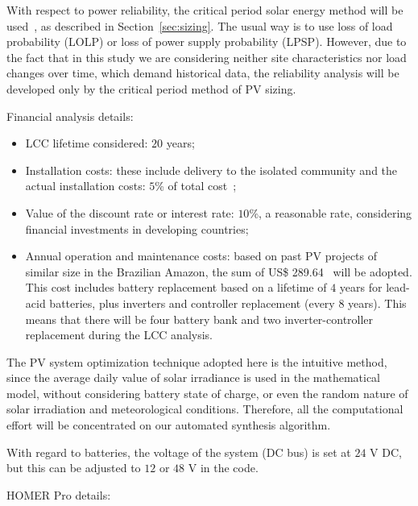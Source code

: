 With respect to power reliability, the critical period solar energy method will be used~\cite{Pinho}, as described in Section~\ref{sec:sizing}. The usual way is to use loss of load probability (LOLP) or loss of power supply probability (LPSP). However, due to the fact that in this study we are considering neither site characteristics nor load changes over time, which demand historical data, the reliability analysis will be developed only by the critical period method of PV sizing.

Financial analysis details:
\begin{itemize}
	\item LCC lifetime considered: $20$ years;
	\item Installation costs: these include delivery to the isolated community and the actual installation costs: $5$\% of total cost~\cite{Agrener2013};
	\item Value of the discount rate or interest rate: $10$\%, a reasonable rate, considering financial investments in developing countries;
	\item Annual operation and maintenance costs: based on past PV projects of similar size in the Brazilian Amazon, the sum of US\$ 289.64~\cite{Agrener2013} will be adopted. This cost includes battery replacement based on a lifetime of $4$ years for lead-acid batteries, plus inverters and controller replacement (every $8$ years). This means that there will be four battery bank and two inverter-controller replacement during the LCC analysis.
\end{itemize}

The PV system optimization technique adopted here is the intuitive method, since the average daily value of solar irradiance is used in the mathematical model, without considering battery state of charge, or even the random nature of solar irradiation and meteorological conditions. Therefore, all the computational effort will be concentrated on our automated synthesis algorithm.

With regard to batteries, the voltage of the system (DC bus) is set at $24$ V DC, but this can be adjusted to $12$ or $48$ V in the code.

HOMER Pro details:

